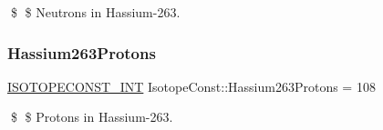 \$ \$ Neutrons in Hassium-\/263. \mbox{\label{group___isotope_const-_hassium-_hs263_ga10b442847f8d6d9eba149ddcf11df8d7}} 
\subsubsection{\texorpdfstring{Hassium263\+Protons}{Hassium263Protons}}
{\footnotesize\ttfamily \mbox{\hyperlink{group___isotope_const-_macros_ga5f18360b3e99483a35c32d789e62621c}{I\+S\+O\+T\+O\+P\+E\+C\+O\+N\+S\+T\+\_\+\+I\+NT}} Isotope\+Const\+::\+Hassium263\+Protons = 108}

\$ \$ Protons in Hassium-\/263. 